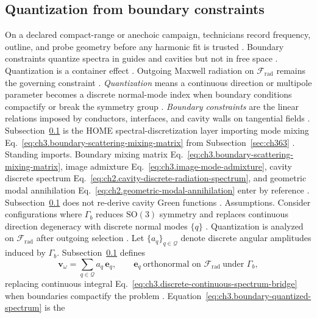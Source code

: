 \subsection{Quantization from boundary constraints}
\label{sec:ch372}
On a declared compact-range or anechoic campaign, technicians record frequency, outline, and probe geometry before any harmonic fit is trusted \cite{hansen1988}. Boundary constraints quantize spectra in guides and cavities but not in free space \cite{stratton1941}. Quantization is a container effect \cite{jackson1999}. Outgoing Maxwell radiation on $\mathcal{F}_{\mathrm{rad}}$ remains the governing constraint \cite{stratton1941}.
\emph{Quantization} means a continuous direction or multipole parameter becomes a discrete normal-mode index when
boundary conditions compactify or break the symmetry group \cite{stratton1941}.
\emph{Boundary constraints} are the linear relations imposed by conductors, interfaces, and cavity walls on tangential
fields \cite{stratton1941}. Subsection~\ref{sec:ch372} is the HOME spectral-discretization layer importing
mode mixing Eq.~\eqref{eq:ch3.boundary-scattering-mixing-matrix} from Subsection~\ref{sec:ch363}
\cite{harrington2001}.
Standing imports. Boundary mixing matrix Eq.~\eqref{eq:ch3.boundary-scattering-mixing-matrix}, image admixture
Eq.~\eqref{eq:ch3.image-mode-admixture}, cavity discrete spectrum Eq.~\eqref{eq:ch2.cavity-discrete-radiation-spectrum},
and geometric modal annihilation Eq.~\eqref{eq:ch2.geometric-modal-annihilation} enter by reference
\cite{stratton1941}. Subsection~\ref{sec:ch372} does not re-derive cavity Green functions
\cite{hansen1988}.
Assumptions. Consider configurations where \(\Gamma_{b}\) reduces \(\mathrm{SO}(3)\) symmetry and replaces continuous direction
degeneracy with discrete normal modes \(\{q\}\) \cite{stratton1941}. Quantization is analyzed on
\(\mathcal{F}_{\mathrm{rad}}\) after outgoing selection \cite{harrington2001}.
Let \(\{a_{q}\}_{q\in\mathcal{Q}}\) denote discrete angular amplitudes induced by \(\Gamma_{b}\). Subsection~\ref{sec:ch372}
defines
\begin{equation}
\label{eq:ch3.boundary-quantized-spectrum}
\mathbf{v}_\omega
=
\sum_{q\in\mathcal{Q}}
a_{q}\,\mathbf{e}_{q},
\qquad
\mathbf{e}_{q}\ \text{orthonormal on }\mathcal{F}_{\mathrm{rad}}\ \text{under }\Gamma_{b},
\end{equation}
replacing continuous integral Eq.~\eqref{eq:ch3.discrete-continuous-spectrum-bridge} when boundaries compactify the
problem \cite{stratton1941}. Equation~\eqref{eq:ch3.boundary-quantized-spectrum} is the
